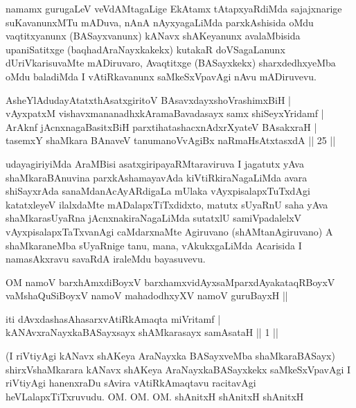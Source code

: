 \begin{artha}
namamx gurugaLeV veVdAMtagaLige EkAtamx tAtapxyaRdiMda sajajxnarige 
suKavanunxMTu mADuva, nAnA nAyxyagaLiMda parxkAshisida oMdu 
vaqtitxyanunx (BASayxvanunx) kANavx shAKeyanunx avalaMbisida 
upaniSatitxge (baqhadAraNayxkakekx) kutakaR doVSagaLanunx 
dUriVkarisuvaMte mADiruvaro, Avaqtitxge (BASayxkekx) sharxdedhxyeMba 
oMdu baladiMda I vAtiRkavanunx saMkeSxVpavAgi nAvu mADiruvevu.
\end{artha}

\begin{shl}
AsheYlAdudayAtatxthAsatxgiritoV BAsavxdayxshoVrashimxBiH |\\
vAyxpatxM vishavxmananadhxkAramaBavadasayx samx shiSeyxYridamf |\\
ArAknf jAcnxnagaBasitxBiH parxtihatashacxnAdxrXyateV BAsakxraH |\\
tasemxY shaMkara BAnaveV tanumanoVvAgiBx naRmaHsAtxtasxdA \hfill|| 25 ||
\end{shl}

\begin{artha}
udayagiriyiMda AraMBisi asatxgiripayaRMtaraviruva I jagatutx yAva 
shaMkaraBAnuvina parxkAshamayavAda kiVtiRkiraNagaLiMda avara 
shiSayxrAda sanaMdanAcAyARdigaLa mUlaka vAyxpisalapxTuTxdAgi 
katatxleyeV ilalxdaMte mADalapxTiTxdidxto, matutx sUyaRnU saha yAva 
shaMkarasUyaRna jAcnxnakiraNagaLiMda sutatxlU samiVpadalelxV 
vAyxpisalapxTaTxvanAgi caMdarxnaMte Agiruvano (shAMtanAgiruvano) A 
shaMkaraneMba sUyaRnige tanu, mana, vAkukxgaLiMda Acarisida I 
namasAkxravu savaRdA iraleMdu bayasuvevu.
\end{artha}


\begin{shl}
OM namoV barxhAmxdiBoyxV barxhamxvidAyxsaMparxdAyakataqRBoyxV \\
vaMshaQuSiBoyxV namoV mahadodhxyXV namoV guruBayxH ||
\end{shl}

\begin{shl}
iti dAvxdashasAhasarxvAtiRkAmaqta miVritamf |\\
kANAvxraNayxkaBASayxsayx shAMkarasayx samAsataH \hfill|| 1 ||
\end{shl}

\begin{artha}
(I riVtiyAgi kANavx shAKeya AraNayxka BASayxveMba shaMkaraBASayx) 
shirxVshaMkarara kANavx shAKeya AraNayxkaBASayxkekx saMkeSxVpavAgi I 
riVtiyAgi hanenxraDu sAvira vAtiRkAmaqtavu racitavAgi 
heVLalapxTiTxruvudu. OM. OM. OM. shAnitxH shAnitxH shAnitxH
\end{artha}

